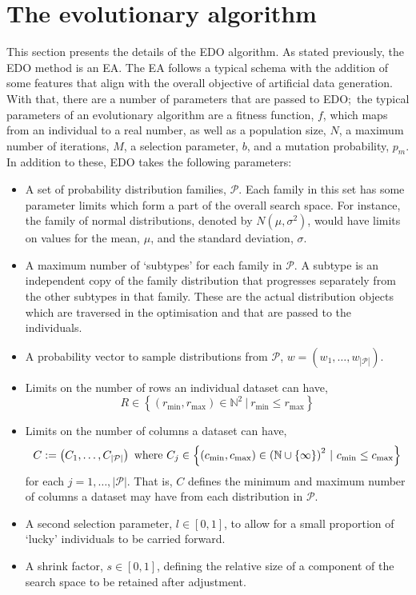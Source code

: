\section{The evolutionary algorithm}\label{section:algorithm}

This section presents the details of the EDO algorithm. As stated previously,
the EDO method is an EA. The EA follows a typical schema with the addition of
some features that align with the overall objective of artificial data
generation. With that, there are a number of parameters that are passed to EDO;\
the typical parameters of an evolutionary algorithm are a fitness function,
\(f\), which maps from an individual to a real number, as well as a population
size, \(N\), a maximum number of iterations, \(M\), a selection parameter,
\(b\), and a mutation probability, \(p_m\). In addition to these, EDO takes the
following parameters:
\begin{itemize}
    \item A set of probability distribution families, \(\mathcal{P}\). Each
        family in this set has some parameter limits which form a part of the
        overall search space. For instance, the family of normal distributions,
        denoted by \(N(\mu, \sigma^2)\), would have limits on values for the
        mean, \(\mu\), and the standard deviation, \(\sigma\).
    \item A maximum number of `subtypes' for each family in \(\mathcal{P}\). A
        subtype is an independent copy of the family distribution that
        progresses separately from the other subtypes in that family. These are
        the actual distribution objects which are traversed in the optimisation
        and that are passed to the individuals.
    \item A probability vector to sample distributions from \(\mathcal{P}\),
        \(w = \left(w_1, \ldots, w_{|\mathcal{P}|}\right)\).
    \item Limits on the number of rows an individual dataset can have,
        \[
            R \in \left\{%
                (r_{\min}, r_{\max}) \in \mathbb{N}^2~|~r_{\min} \leq r_{\max}
            \right\}
        \]
    \item Limits on the number of columns a dataset can have,
        \[
            C := \left(C_1, \ldots, C_{|\mathcal{P}|}\right)
            \text{ where }
            C_j \in \left\{ (c_{\min}, c_{\max}) \in {%
                \left(\mathbb{N}\cup\{\infty\}\right)
            }^2~|~c_{\min} \leq c_{\max}\right\}
        \]
        for each \(j = 1, \ldots, |\mathcal{P}|\). That is, \(C\) defines the
        minimum and maximum number of columns a dataset may have from each
        distribution in \(\mathcal{P}\).
    \item A second selection parameter, \(l \in [0, 1]\), to allow for a
        small proportion of `lucky' individuals to be carried forward.
    \item A shrink factor, \(s \in [0, 1]\), defining the relative size of a
        component of the search space to be retained after adjustment.
\end{itemize}

